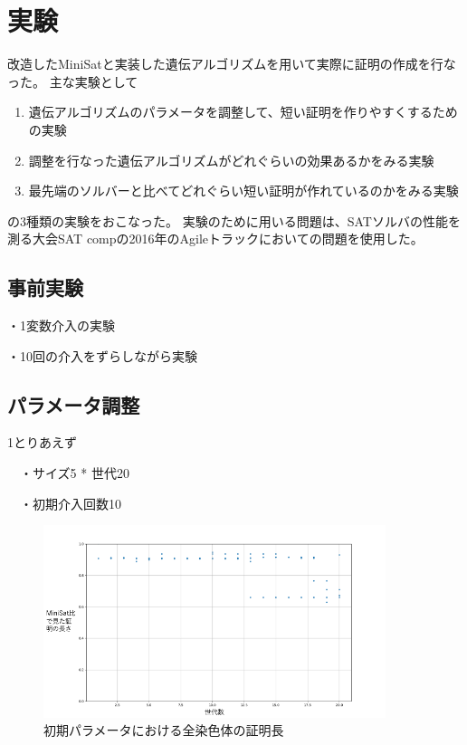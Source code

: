 \section{実験}

改造したMiniSatと実装した遺伝アルゴリズムを用いて実際に証明の作成を行なった。
主な実験として
\begin{enumerate}
    \item 遺伝アルゴリズムのパラメータを調整して、短い証明を作りやすくするための実験
    \item 調整を行なった遺伝アルゴリズムがどれぐらいの効果あるかをみる実験
    \item 最先端のソルバーと比べてどれぐらい短い証明が作れているのかをみる実験
\end{enumerate}
の3種類の実験をおこなった。
実験のために用いる問題は、SATソルバの性能を測る大会SAT compの2016年のAgileトラックにおいての問題を使用した。


\setcounter{subsection}{-1}

\subsection{事前実験}%

・1変数介入の実験

・10回の介入をずらしながら実験

\subsection{パラメータ調整}%

1とりあえず

　・サイズ5 * 世代20

　・初期介入回数10

\begin{figure}[h]
    \centering
    \includegraphics[width=10cm]{figures/Experiment1/1.png}
    \caption{初期パラメータにおける全染色体の証明長}
\end{figure}


